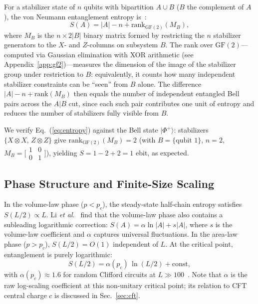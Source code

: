 \documentclass[twocolumn,prl,aps,floatfix]{revtex4-2}
\begin{document}
For a stabilizer state of $n$ qubits with bipartition $A \cup B$
($B$ the complement of $A$), the von Neumann entanglement entropy is~\cite{Hamma2005}:
\begin{equation}
  S(A) = |A| - n + \mathrm{rank}_{\mathrm{GF}(2)}(M_B),
  \label{eq:entropy}
\end{equation}
where $M_B$ is the $n \times 2|B|$ binary matrix formed by restricting the $n$
stabilizer generators to the $X$- and $Z$-columns on subsystem $B$.
The rank over $\mathrm{GF}(2)$---computed via Gaussian elimination with XOR
arithmetic (see Appendix~\ref{app:gf2})---measures the dimension of the image
of the stabilizer group under restriction to $B$: equivalently, it counts how
many independent stabilizer constraints can be ``seen'' from $B$ alone.
The difference $|A| - n + \mathrm{rank}(M_B)$ then equals the number of
independent entangled Bell pairs across the $A|B$ cut, since each such pair
contributes one unit of entropy and reduces the number of stabilizers
fully visible from $B$.

We verify Eq.~(\ref{eq:entropy}) against the Bell state $|\Phi^+\rangle$:
stabilizers $\{X\otimes X,\, Z\otimes Z\}$ give
$\mathrm{rank}_{\mathrm{GF}(2)}(M_B) = 2$ (with $B = \{\text{qubit }1\}$, $n=2$,
$M_B = \bigl[\begin{smallmatrix}1&0\\0&1\end{smallmatrix}\bigr]$),
yielding $S = 1 - 2 + 2 = 1$ ebit, as expected.

\subsection{Phase Structure and Finite-Size Scaling}

In the volume-law phase ($p < p_c$), the steady-state half-chain entropy satisfies
$S(L/2) \propto L$.
Li \textit{et al.}~\cite{Li2019} find that the volume-law phase also contains a
subleading logarithmic correction: $S(A) = \alpha \ln|A| + s|A|$, where
$s$ is the volume-law coefficient and $\alpha$ captures universal fluctuations.
In the area-law phase ($p > p_c$), $S(L/2) = O(1)$ independent of $L$.
At the critical point, entanglement is purely logarithmic:
\begin{equation}
  S(L/2) = \alpha(p_c)\,\ln(L/2) + \mathrm{const},
  \label{eq:logscale}
\end{equation}
with $\alpha(p_c) \approx 1.6$ for random Clifford circuits at $L \gg 100$~\cite{Li2019}.
Note that $\alpha$ is the raw log-scaling coefficient at this non-unitary
critical point; its relation to CFT central charge $c$ is discussed in
Sec.~\ref{sec:cft}.
\end{document}
